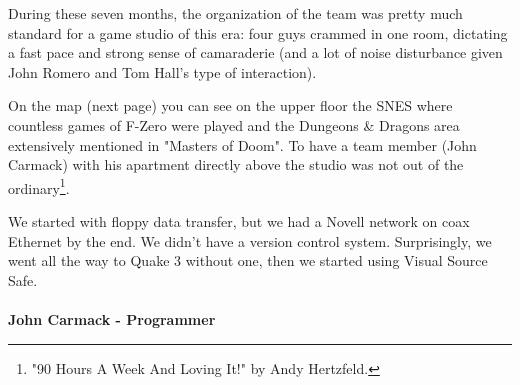 \documentclass[book.tex]{subfiles}
\begin{document}
During these seven months, the organization of the team was pretty much standard for a game studio of this era: four guys crammed in one room, dictating a fast pace and strong sense of camaraderie (and a lot of noise disturbance given John Romero and Tom Hall's type of interaction).\\
\par On the map (next page) you can see on the upper floor the SNES where countless games of F-Zero were played and the Dungeons \& Dragons area extensively mentioned in "Masters of Doom". To have a team member (John Carmack) with his apartment directly above the studio was not out of the ordinary\footnote{ "90 Hours A Week And Loving It!" by Andy Hertzfeld.}.\\
\par
\begin{fancyquotes}
We started with floppy data transfer, but we had a Novell network on coax Ethernet by the end. We didn't have a version control system.  Surprisingly, we went all the way to Quake 3 without one, then we started using Visual Source Safe.\\
 \\
\textbf{John Carmack - Programmer}
\end{fancyquotes}
\end{document}
